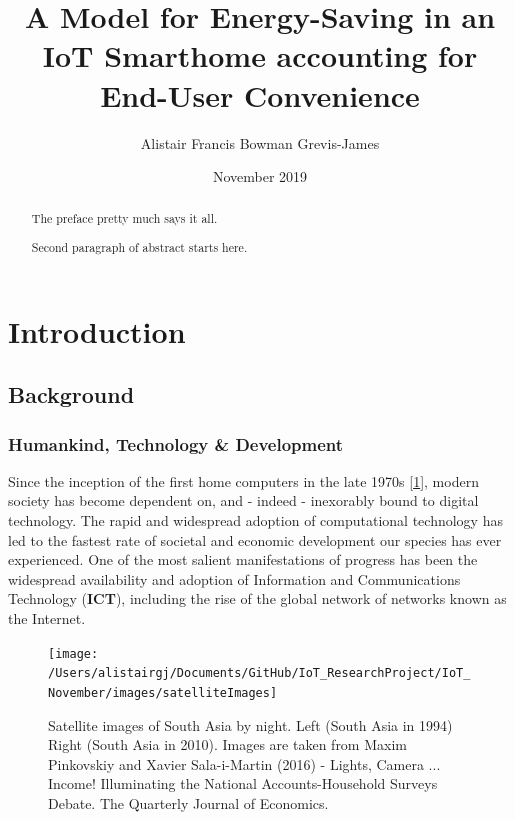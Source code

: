 \documentclass[11pt,]{article}
\title{A Model for Energy-Saving in an IoT Smarthome accounting for End-User
Convenience}
\author{Alistair Francis Bowman Grevis-James}
\date{November 2019}
\begin{document}
\maketitle
\begin{abstract}
The preface pretty much says it all.

\par

Second paragraph of abstract starts here. \pagebreak
\end{abstract}

{
\setcounter{tocdepth}{3}
\tableofcontents
}
\pagebreak

\hypertarget{introduction}{%
\section{Introduction}\label{introduction}}

\hypertarget{background}{%
\subsection{Background}\label{background}}

\hypertarget{humankind-technology-development}{%
\subsubsection{Humankind, Technology \&
Development}\label{humankind-technology-development}}

Since the inception of the first home computers in the late 1970s
{[}\protect\hyperlink{ref-pressAltairHistoryPersonal1993}{1}{]}, modern
society has become dependent on, and - indeed - inexorably bound to
digital technology. The rapid and widespread adoption of computational
technology has led to the fastest rate of societal and economic
development our species has ever experienced. One of the most salient
manifestations of progress has been the widespread availability and
adoption of Information and Communications Technology (\textbf{ICT}),
including the rise of the global network of networks known as the
Internet.

\begin{figure}[H]

{\centering \texttt{[image: /Users/alistairgj/Documents/GitHub/IoT\_ResearchProject/IoT\_November/images/satelliteImages]} 

}

\caption{Satellite images of South Asia by night. Left (South Asia in 1994) Right (South Asia in 2010). Images are taken from Maxim Pinkovskiy and Xavier Sala-i-Martin (2016) - Lights, Camera ... Income! Illuminating the National Accounts-Household Surveys Debate. The Quarterly Journal of Economics.}\label{fig:satelliteImagesAsia}
\end{figure}
\end{document}
